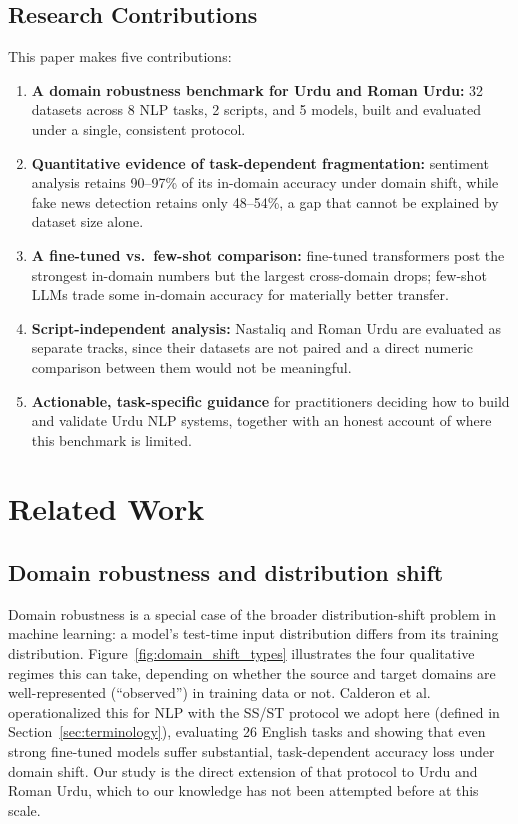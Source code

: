 \documentclass[10pt,twocolumn,journal]{IEEEtran}
\begin{document}
\subsection{Research Contributions}

This paper makes five contributions:

\begin{enumerate}[leftmargin=*]
\item \textbf{A domain robustness benchmark for Urdu and Roman Urdu:} 32 datasets across 8 NLP tasks, 2 scripts, and 5 models, built and evaluated under a single, consistent protocol.
\item \textbf{Quantitative evidence of task-dependent fragmentation:} sentiment analysis retains 90--97\% of its in-domain accuracy under domain shift, while fake news detection retains only 48--54\%, a gap that cannot be explained by dataset size alone.
\item \textbf{A fine-tuned vs.\ few-shot comparison:} fine-tuned transformers post the strongest in-domain numbers but the largest cross-domain drops; few-shot LLMs trade some in-domain accuracy for materially better transfer.
\item \textbf{Script-independent analysis:} Nastaliq and Roman Urdu are evaluated as separate tracks, since their datasets are not paired and a direct numeric comparison between them would not be meaningful.
\item \textbf{Actionable, task-specific guidance} for practitioners deciding how to build and validate Urdu NLP systems, together with an honest account of where this benchmark is limited.
\end{enumerate}

\section{Related Work}

\subsection{Domain robustness and distribution shift}
Domain robustness is a special case of the broader distribution-shift problem in machine learning: a model's test-time input distribution differs from its training distribution. Figure~\ref{fig:domain_shift_types} illustrates the four qualitative regimes this can take, depending on whether the source and target domains are well-represented (``observed'') in training data or not. Calderon et al.~\cite{calderon2024measuring} operationalized this for NLP with the SS/ST protocol we adopt here (defined in Section~\ref{sec:terminology}), evaluating 26 English tasks and showing that even strong fine-tuned models suffer substantial, task-dependent accuracy loss under domain shift. Our study is the direct extension of that protocol to Urdu and Roman Urdu, which to our knowledge has not been attempted before at this scale.
\end{document}
